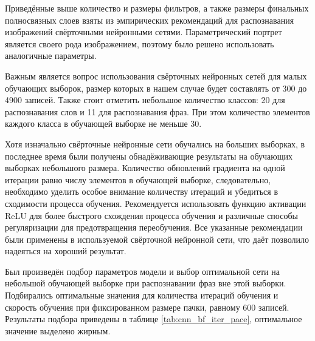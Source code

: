 Приведённые выше количество и размеры фильтров, а также размеры финальных полносвязных слоев взяты из эмпирических рекомендаций для распознавания изображений свёрточными нейронными сетями.
Параметрический портрет является своего рода изображением, поэтому было решено использовать аналогичные параметры.

Важным является вопрос использования свёрточных нейронных сетей для малых обучающих выборок, размер которых в нашем случае будет составлять от 300 до 4900 записей.
Также стоит отметить небольшое количество классов: 20 для распознавания слов и 11 для распознавания фраз.
При этом количество элементов каждого класса в обучающей выборке не меньше 30.

Хотя изначально свёрточные нейронные сети обучались на больших выборках, в последнее время были получены обнадёживающие результаты на обучающих выборках небольшого размера.
Количество обновлений градиента на одной итерации равно числу элементов в обучающей выборке, следовательно, необходимо уделить особое внимание количеству итераций и убедиться в сходимости процесса обучения.
Рекомендуется использовать функцию активации ReLU для более быстрого схождения процесса обучения и различные способы регуляризации для предотвращения переобучения.
Все указанные рекомендации были применены в используемой свёрточной нейронной сети, что даёт позволило надеяться на хороший результат.

Был произведён подбор параметров модели и выбор оптимальной сети на небольшой обучающей выборке при распознавании фраз вне этой выборки.
Подбирались оптимальные значения для количества итераций обучения и скорость обучения при фиксированном размере пачки, равному 600 записей.
Результаты подбора приведены в таблице \ref{tab:cnn_bf_iter_pace}, оптимальное значение выделено жирным.

